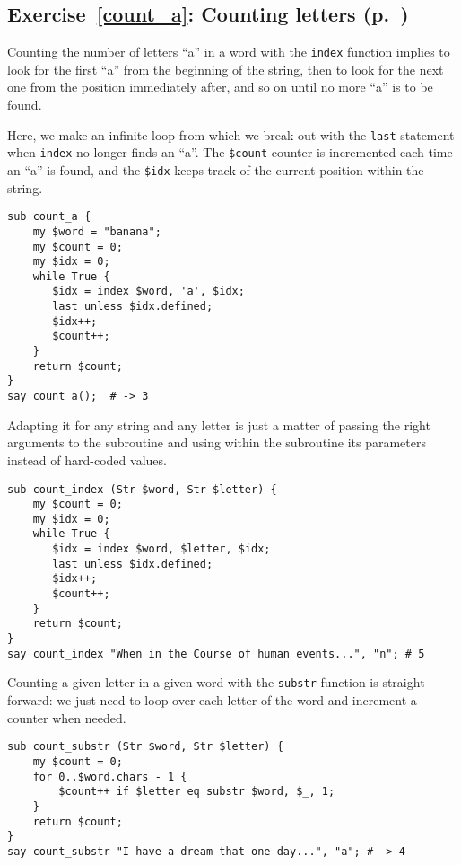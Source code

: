 \subsection{Exercise~\ref{count_a}: Counting letters (p.~\pageref{count_a})}
\label{sol_count_a}

Counting the number of letters ``a'' in a word with the {\tt index} 
function implies to look for the first ``a'' from the 
beginning of the string, then to look for the next one 
from the position immediately after, and so on until no 
more ``a'' is to be found.

Here, we make an infinite loop from which we break out with 
the {\tt last} statement when {\tt index} no longer finds 
an ``a''. The {\tt \$count} counter is incremented each time 
an ``a'' is found, and the {\tt \$idx} keeps track of the 
current position within the string.

\begin{verbatim}
sub count_a {
    my $word = "banana";
    my $count = 0;
    my $idx = 0;
    while True {
       $idx = index $word, 'a', $idx;
       last unless $idx.defined;
       $idx++;
       $count++;
    }
    return $count;
}
say count_a();  # -> 3
\end{verbatim}

Adapting it for any string and any letter is just a matter 
of passing the right arguments to the subroutine and using 
within the subroutine its parameters instead of hard-coded 
values.

\begin{verbatim}
sub count_index (Str $word, Str $letter) {
    my $count = 0;
    my $idx = 0;
    while True {
       $idx = index $word, $letter, $idx;
       last unless $idx.defined;
       $idx++;
       $count++;
    }
    return $count;
}
say count_index "When in the Course of human events...", "n"; # 5
\end{verbatim}

Counting a given letter in a given word with the {\tt substr} 
function is straight forward: we just need to loop over 
each letter of the word and increment a counter when needed.

\begin{verbatim}
sub count_substr (Str $word, Str $letter) {
    my $count = 0;
    for 0..$word.chars - 1 {
        $count++ if $letter eq substr $word, $_, 1;
    }
    return $count;
}
say count_substr "I have a dream that one day...", "a"; # -> 4
\end{verbatim}


